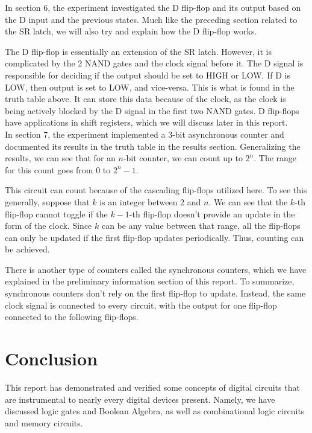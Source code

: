 \documentclass{report}
\begin{document}
		In section 6, the experiment investigated the D flip-flop and its output based on the D input and the previous states. Much like the preceding section related to the SR latch, we will also try and explain how the D flip-flop works.
		
		The D flip-flop is essentially an extension of the SR latch. However, it is complicated by the 2 NAND gates and the clock signal before it. The D signal is responsible for deciding if the output should be set to HIGH or LOW. If D is LOW, then output is set to LOW, and vice-versa. This is what is found in the truth table above. It can store this data because of the clock, as the clock is being actively blocked by the D signal in the first two NAND gates. D flip-flops have applications in shift registers, which we will discuss later in this report. \\
		
		In section 7, the experiment implemented a $3$-bit asynchronous counter and documented its results in the truth table in the results section. Generalizing the results, we can see that for an $n$-bit counter, we can count up to $2^n$. The range for this count goes from $0$ to $2^n - 1$.
		
		This circuit can count because of the cascading flip-flops utilized here. To see this generally, suppose that $k$ is an integer between $2$ and $n$. We can see that the $k$-th flip-flop cannot toggle if the $k-1$-th flip-flop doesn't provide an update in the form of the clock. Since $k$ can be any value between that range, all the flip-flops can only be updated if the first flip-flop updates periodically. Thus, counting can be achieved.
		
		There is another type of counters called the synchronous counters, which we have explained in the preliminary information section of this report. To summarize, synchronous counters don't rely on the first flip-flop to update. Instead, the same clock signal is connected to every circuit, with the output for one flip-flop connected to the following flip-flops.

\section{Conclusion}
	This report has demonstrated and verified some concepts of digital circuits that are instrumental to nearly every digital devices present. Namely, we have discussed logic gates and Boolean Algebra, as well as combinational logic circuits and memory circuits. \\
	
\end{document}
